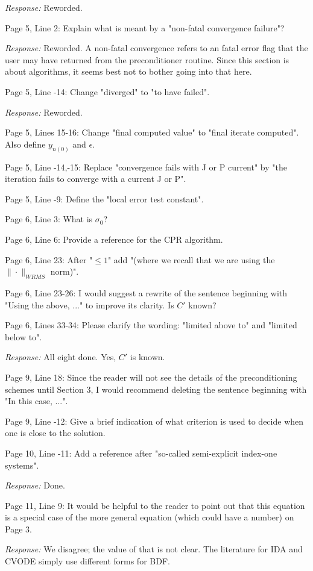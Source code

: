 \documentclass[12pt]{letter}
\begin{document}
{\em Response:} Reworded.

Page 5, Line 2: Explain what is meant by a "non-fatal convergence failure"?

{\em Response:} Reworded.  A non-fatal convergence refers to an fatal
error flag that the user may have returned from the preconditioner
routine.  Since this section is about algorithms, it seems best not to
bother going into that here.

Page 5, Line -14: Change "diverged" to "to have failed".

{\em Response:} Reworded.

Page 5, Lines 15-16: Change "final computed value" to "final iterate
computed". Also define $y_{n(0)}$ and $\epsilon$.

Page 5, Line -14,-15: Replace "convergence fails with J or P current" by
"the iteration fails to converge with a current J or P".

Page 5, Line -9: Define the "local error test constant".

Page 6, Line 3: What is $\sigma_ 0$?  

Page 6, Line 6: Provide a reference for the CPR algorithm.

Page 6, Line 23: After "$ \leq 1$" add "(where we recall that we are
using the $\|\cdot\|_{WRMS}$ norm)".

Page 6, Line 23-26: I would suggest a rewrite of the sentence beginning 
with "Using the above, ..."  to improve its clarity. Is $C'$ known?

Page 6, Lines 33-34: Please clarify the wording: "limited above to" and
"limited below to".

{\em Response:} All eight done. Yes, $C'$ is known.

Page 9, Line 18: Since the reader will not see the details of the
preconditioning schemes until Section 3, I would recommend deleting
the sentence beginning with "In this case, ...".

Page 9, Line -12: Give a brief indication of what criterion is used to
decide when one is close to the solution.

Page 10, Line -11: Add a reference after "so-called semi-explicit
index-one systems".

{\em Response:} Done.

Page 11, Line 9: It would be helpful to the reader to point out that
this equation is a special case of the more general equation (which
could have a number) on Page 3.

{\em Response:} We disagree; the value of that is not clear.  The
literature for IDA and CVODE simply use different forms for BDF.
\end{document}
